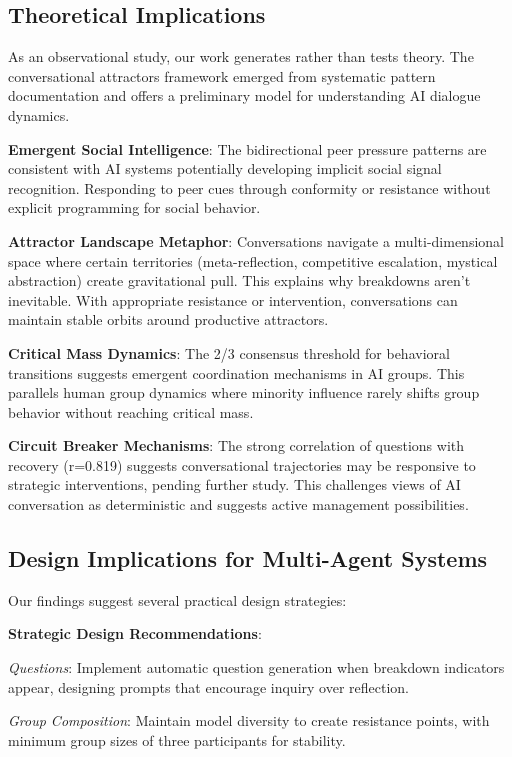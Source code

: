 \documentclass[11pt,letterpaper]{article}
\newcommand{\exponedataQuestionCorrelation}{0.819}
\begin{document}
\subsection{Theoretical Implications}

As an observational study, our work generates rather than tests theory. The conversational attractors framework emerged from systematic pattern documentation and offers a preliminary model for understanding AI dialogue dynamics.

\textbf{Emergent Social Intelligence}: The bidirectional peer pressure patterns are consistent with AI systems potentially developing implicit social signal recognition. Responding to peer cues through conformity or resistance without explicit programming for social behavior.

\textbf{Attractor Landscape Metaphor}: Conversations navigate a multi-dimensional space where certain territories (meta-reflection, competitive escalation, mystical abstraction) create gravitational pull. This explains why breakdowns aren't inevitable. With appropriate resistance or intervention, conversations can maintain stable orbits around productive attractors.

\textbf{Critical Mass Dynamics}: The 2/3 consensus threshold for behavioral transitions suggests emergent coordination mechanisms in AI groups. This parallels human group dynamics where minority influence rarely shifts group behavior without reaching critical mass.

\textbf{Circuit Breaker Mechanisms}: The strong correlation of questions with recovery (r=\exponedataQuestionCorrelation{}) suggests conversational trajectories may be responsive to strategic interventions, pending further study. This challenges views of AI conversation as deterministic and suggests active management possibilities.

\subsection{Design Implications for Multi-Agent Systems}

Our findings suggest several practical design strategies:

\textbf{Strategic Design Recommendations}:

\textit{Questions}: Implement automatic question generation when breakdown indicators appear, designing prompts that encourage inquiry over reflection.

\textit{Group Composition}: Maintain model diversity to create resistance points, with minimum group sizes of three participants for stability.
\end{document}
